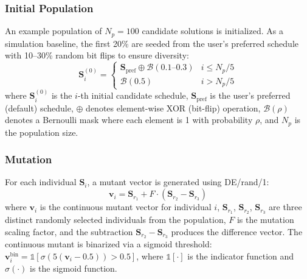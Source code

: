 \documentclass[journal]{IEEEtran}
\begin{document}
\subsubsection{Initial Population} An example population of $N_p = 100$ candidate solutions is initialized. As a simulation baseline, the first 20\% are seeded from the user's preferred schedule with 10--30\% random bit flips to ensure diversity:
\begin{equation}
    \mathbf{S}_i^{(0)} = \begin{cases}
        \mathbf{S}_{\text{pref}} \oplus \mathcal{B}(0.1 \text{--} 0.3) & i \leq N_p/5 \\
        \mathcal{B}(0.5) & i > N_p/5
    \end{cases}
    \label{eq:init_pop}
\end{equation}
where $\mathbf{S}_i^{(0)}$ is the $i$-th initial candidate schedule, $\mathbf{S}_{\text{pref}}$ is the user's preferred (default) schedule, $\oplus$ denotes element-wise XOR (bit-flip) operation, $\mathcal{B}(\rho)$ denotes a Bernoulli mask where each element is 1 with probability $\rho$, and $N_p$ is the population size.

\subsubsection{Mutation} For each individual $\mathbf{S}_i$, a mutant vector is generated using DE/rand/1:
\begin{equation}
    \mathbf{v}_i = \mathbf{S}_{r_1} + F \cdot (\mathbf{S}_{r_2} - \mathbf{S}_{r_3})
    \label{eq:mutation}
\end{equation}
where $\mathbf{v}_i$ is the continuous mutant vector for individual $i$, $\mathbf{S}_{r_1}$, $\mathbf{S}_{r_2}$, $\mathbf{S}_{r_3}$ are three distinct randomly selected individuals from the population, $F$ is the mutation scaling factor, and the subtraction $\mathbf{S}_{r_2} - \mathbf{S}_{r_3}$ produces the difference vector. The continuous mutant is binarized via a sigmoid threshold: $\mathbf{v}_i^{\text{bin}} = \mathbb{1}[\sigma(5(\mathbf{v}_i - 0.5)) > 0.5]$, where $\mathbb{1}[\cdot]$ is the indicator function and $\sigma(\cdot)$ is the sigmoid function.
\end{document}
